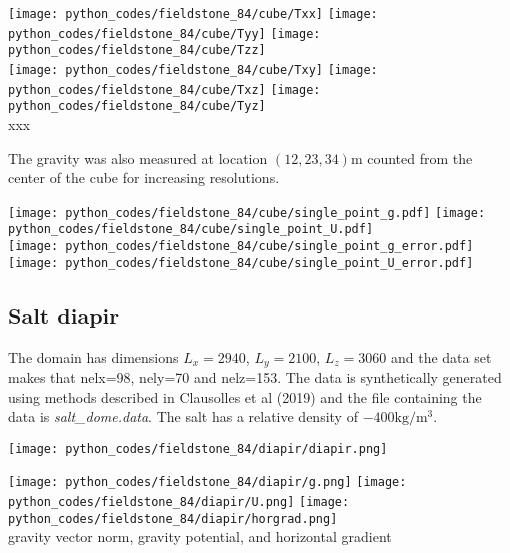 \begin{center}
\texttt{[image: python\_codes/fieldstone\_84/cube/Txx]}
\texttt{[image: python\_codes/fieldstone\_84/cube/Tyy]}
\texttt{[image: python\_codes/fieldstone\_84/cube/Tzz]}\\
\texttt{[image: python\_codes/fieldstone\_84/cube/Txy]}
\texttt{[image: python\_codes/fieldstone\_84/cube/Txz]}
\texttt{[image: python\_codes/fieldstone\_84/cube/Tyz]}\\
{\captionfont  xxx}
\end{center}

The gravity was also measured at location $(12,23,34)\si{\metre}$ counted from the center of the cube
for increasing resolutions. 

\begin{center}
\texttt{[image: python\_codes/fieldstone\_84/cube/single\_point\_g.pdf]}
\texttt{[image: python\_codes/fieldstone\_84/cube/single\_point\_U.pdf]}\\
\texttt{[image: python\_codes/fieldstone\_84/cube/single\_point\_g\_error.pdf]}
\texttt{[image: python\_codes/fieldstone\_84/cube/single\_point\_U\_error.pdf]}\\
\end{center}


\newpage
\subsection*{Salt diapir}


The domain has dimensions $L_x=2940$, $L_y=2100$, $L_z=3060$ and the data set makes that  
nelx=98, nely=70 and nelz=153. The data is
synthetically generated using methods described in 
Clausolles et al (2019) \cite{clcc19}
and the file containing the data is {\sl salt\_dome.data}.
The salt has a relative density of $-400\si{\kg\per\cubic\metre}$.

\begin{center}
\texttt{[image: python\_codes/fieldstone\_84/diapir/diapir.png]}
\end{center}


\begin{center}
\texttt{[image: python\_codes/fieldstone\_84/diapir/g.png]}
\texttt{[image: python\_codes/fieldstone\_84/diapir/U.png]}
\texttt{[image: python\_codes/fieldstone\_84/diapir/horgrad.png]}\\
{\captionfont gravity vector norm, gravity potential, and horizontal gradient}
\end{center}



